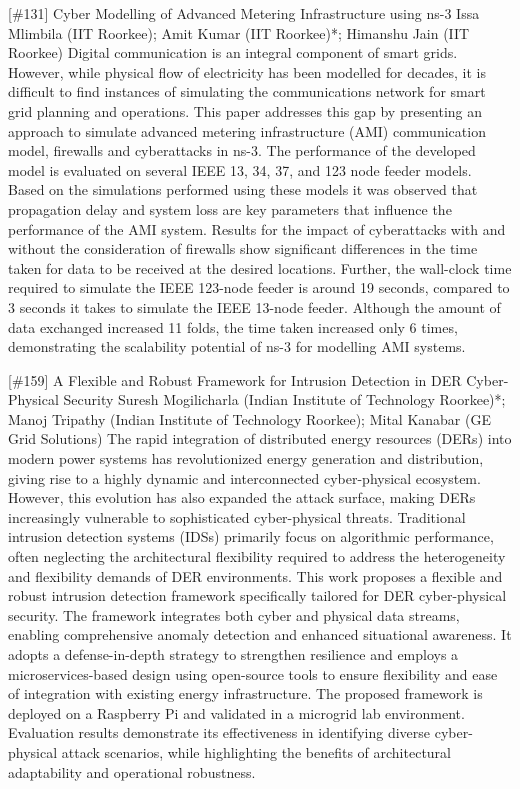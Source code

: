 {} \begin{abstract_online} {[\#131] Cyber Modelling of Advanced Metering Infrastructure using  ns-3} {} {Issa Mlimbila (IIT Roorkee); Amit Kumar (IIT Roorkee)*;  Himanshu  Jain (IIT Roorkee)} {} Digital communication is an integral component of smart grids. However, while physical flow of electricity has been modelled for decades, it is difficult to find instances of simulating the communications network for smart grid planning and operations. This paper addresses this gap by presenting an approach to simulate advanced metering infrastructure (AMI) communication model, firewalls and cyberattacks in ns-3. The performance of the developed model is evaluated on several IEEE 13, 34, 37, and 123 node feeder models. Based on the simulations performed using these models it was observed that propagation delay and system loss are key parameters that influence the performance of the AMI system. Results for the impact of cyberattacks with and without the consideration of firewalls show significant differences in the time taken for data to be received at the desired locations. Further, the wall-clock time required to simulate the IEEE 123-node feeder is around 19 seconds, compared to 3 seconds it takes to simulate the IEEE 13-node feeder. Although the amount of data exchanged increased 11 folds, the time taken increased only 6 times, demonstrating the scalability potential of ns-3 for modelling AMI systems. \end{abstract_online} 
{} \begin{abstract_online} {[\#159] A Flexible and Robust Framework for Intrusion Detection in DER Cyber-Physical Security} {} {Suresh Mogilicharla (Indian Institute of Technology Roorkee)*; Manoj Tripathy (Indian Institute of Technology Roorkee); Mital Kanabar (GE Grid Solutions)} {} The rapid integration of distributed energy resources (DERs) into modern power systems has revolutionized energy generation and distribution, giving rise to a highly dynamic and interconnected cyber-physical ecosystem. However, this evolution has also expanded the attack surface, making DERs increasingly vulnerable to sophisticated cyber-physical threats. Traditional intrusion detection systems (IDSs) primarily focus on algorithmic performance, often neglecting the architectural flexibility required to address the heterogeneity and flexibility demands of DER environments. This work proposes a flexible and robust intrusion detection framework specifically tailored for DER cyber-physical security. The framework integrates both cyber and physical data streams, enabling comprehensive anomaly detection and enhanced situational awareness. It adopts a defense-in-depth strategy to strengthen resilience and employs a microservices-based design using open-source tools to ensure flexibility and ease of integration with existing energy infrastructure. The proposed framework is deployed on a Raspberry Pi and validated in a microgrid lab environment. Evaluation results demonstrate its effectiveness in identifying diverse cyber-physical attack scenarios, while highlighting the benefits of architectural adaptability and operational robustness. \end{abstract_online} 
